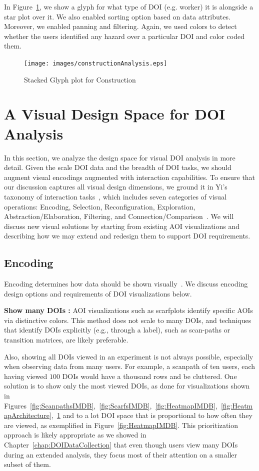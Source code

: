 In Figure~\ref{fig:constructionAnalysis}, we show a glyph for what type of DOI (e.g. worker) it is alongside a star plot over it. We also enabled sorting option based on data attributes. Moreover, we enabled panning and filtering. Again, we used colors to detect whether the users identified any hazard over a particular DOI and color coded them. 

\begin{figure}
  \centering
  \texttt{[image: images/constructionAnalysis.eps]}
  \caption{Stacked Glyph plot for Construction}
	\label{fig:constructionAnalysis}
\end{figure}

\section{A Visual Design Space for DOI Analysis}

In this section, we analyze the design space for visual DOI analysis in more detail. Given the scale DOI data and the breadth of DOI tasks, we should augment visual encodings augmented with interaction capabilities. To ensure that our discussion captures all visual design dimensions, we ground it in Yi's taxonomy of interaction tasks~\cite{Yi07}, which includes seven categories of visual operations: Encoding, Selection, Reconfiguration, Exploration, Abstraction/Elaboration, Filtering, and Connection/Comparison~\cite{Yi07}. We will discuss new visual solutions by starting from existing AOI visualizations and describing how we may extend and redesign them to support DOI requirements. 

\subsection{Encoding}
\label{sec:Encoding}
Encoding determines how data should be shown visually~\cite{Yi07}. We discuss encoding design options and requirements of DOI visualizations below.

\textbf{Show many DOIs :} AOI visualizations such as scarfplots identify specific AOIs via distinctive colors. This method does not scale to many DOIs, and techniques that identify DOIs explicitly (e.g., through a label), such as scan-paths or transition matrices, are likely preferable. 

Also, showing all DOIs viewed in an experiment is not always possible, especially when observing data from many users. For example, a scanpath of ten users, each having viewed $100$ DOIs would have a thousand rows and be cluttered. One solution is to show only the most viewed DOIs, as done for visualizations shown in Figures~\ref{fig:ScanpathsIMDB},~\ref{fig:ScarfsIMDB},~\ref{fig:HeatmapIMDB},~\ref{fig:HeatmapArchitecture},~\ref{fig:constructionAnalysis} and to a lot DOI space that is proportional to how often they are viewed, as exemplified in Figure~\ref{fig:HeatmapIMDB}. This prioritization approach is likely appropriate as we showed in Chapter~\ref{chap:DOIDataCollection} that even though users view many DOIs during an extended analysis, they focus most of their attention on a smaller subset of them. 

